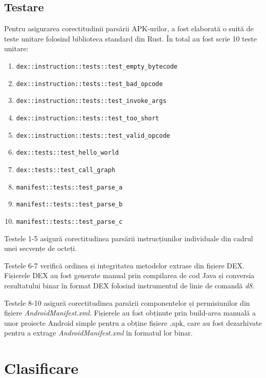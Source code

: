 \documentclass[12pt,a4paper]{report}
\begin{document}
\subsection{Testare}
Pentru asigurarea corectitudinii parsării APK-urilor, a fost elaborată o suită de teste unitare
folosind biblioteca standard din Rust.
În total au fost scrie 10 teste unitare:
\begin{enumerate}
      \item \verb|dex::instruction::tests::test_empty_bytecode|
      \item \verb|dex::instruction::tests::test_bad_opcode|
      \item \verb|dex::instruction::tests::test_invoke_args|
      \item \verb|dex::instruction::tests::test_too_short|
      \item \verb|dex::instruction::tests::test_valid_opcode|
      \item \verb|dex::tests::test_hello_world|
      \item \verb|dex::tests::test_call_graph|
      \item \verb|manifest::tests::test_parse_a|
      \item \verb|manifest::tests::test_parse_b|
      \item \verb|manifest::tests::test_parse_c|
\end{enumerate}

Testele 1-5 asigură corectitudinea parsării instrucțiunilor individuale din cadrul unei secvențe de octeți.

Testele 6-7 verifică ordinea și integritatea metodelor extrase din fișiere DEX.
Fișierele DEX au fost generate manual prin compilarea de cod Java 
și conversia rezultatului binar în format DEX folosind instrumentul de linie de comandă \textit{d8}\cite{d8}.

Testele 8-10 asigură corectitudinea parsării componentelor și permisiunilor din fișiere \textit{AndroidManifest.xml}.
Fișierele au fost obținute prin build-area manuală a unor proiecte Android simple pentru a obține fișiere .apk,
care au fost dezarhivate pentru a extrage \textit{AndroidManifest.xml} în formatul lor binar.

\section{Clasificare}
\end{document}

